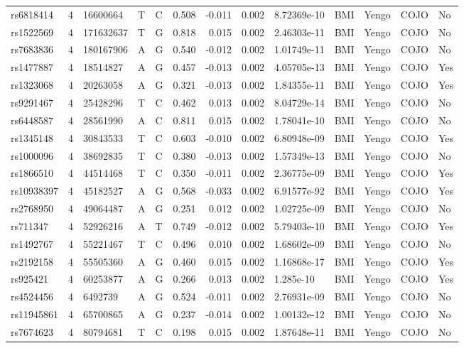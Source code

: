 \documentclass[11pt,twoside]{bristolthesis}
\begin{document}
\begin{longtable}[t]{lrlllrrrlllll}
rs6818414 & 4 & 16600664 & T & C & 0.508 & -0.011 & 0.002 & 8.72369e-10 & BMI & Yengo & COJO & No\\
\addlinespace
rs1522569 & 4 & 171632637 & T & G & 0.818 & 0.015 & 0.002 & 2.46303e-11 & BMI & Yengo & COJO & No\\
rs7683836 & 4 & 180167906 & A & G & 0.540 & -0.012 & 0.002 & 1.01749e-11 & BMI & Yengo & COJO & No\\
rs1477887 & 4 & 18514827 & A & G & 0.457 & -0.013 & 0.002 & 4.05705e-13 & BMI & Yengo & COJO & Yes\\
rs1323068 & 4 & 20263058 & A & G & 0.321 & -0.013 & 0.002 & 1.84355e-11 & BMI & Yengo & COJO & Yes\\
rs9291467 & 4 & 25428296 & T & C & 0.462 & 0.013 & 0.002 & 8.04729e-14 & BMI & Yengo & COJO & No\\
\addlinespace
rs6448587 & 4 & 28561990 & A & C & 0.811 & 0.015 & 0.002 & 1.78041e-10 & BMI & Yengo & COJO & No\\
rs1345148 & 4 & 30843533 & T & C & 0.603 & -0.010 & 0.002 & 6.80948e-09 & BMI & Yengo & COJO & Yes\\
rs1000096 & 4 & 38692835 & T & C & 0.380 & -0.013 & 0.002 & 1.57349e-13 & BMI & Yengo & COJO & No\\
rs1866510 & 4 & 44514468 & T & C & 0.350 & -0.011 & 0.002 & 2.36775e-09 & BMI & Yengo & COJO & Yes\\
rs10938397 & 4 & 45182527 & A & G & 0.568 & -0.033 & 0.002 & 6.91577e-92 & BMI & Yengo & COJO & Yes\\
\addlinespace
rs2768950 & 4 & 49064487 & A & G & 0.251 & 0.012 & 0.002 & 1.02725e-09 & BMI & Yengo & COJO & No\\
rs711347 & 4 & 52926216 & A & T & 0.749 & -0.012 & 0.002 & 5.79403e-10 & BMI & Yengo & COJO & Yes\\
rs1492767 & 4 & 55221467 & T & C & 0.496 & 0.010 & 0.002 & 1.68602e-09 & BMI & Yengo & COJO & No\\
rs2192158 & 4 & 55505360 & A & G & 0.460 & 0.015 & 0.002 & 1.16868e-17 & BMI & Yengo & COJO & Yes\\
rs925421 & 4 & 60253877 & A & G & 0.266 & 0.013 & 0.002 & 1.285e-10 & BMI & Yengo & COJO & Yes\\
\addlinespace
rs4524456 & 4 & 6492739 & A & G & 0.524 & -0.011 & 0.002 & 2.76931e-09 & BMI & Yengo & COJO & No\\
rs11945861 & 4 & 65700865 & A & G & 0.237 & -0.014 & 0.002 & 1.00132e-12 & BMI & Yengo & COJO & No\\
rs7674623 & 4 & 80794681 & T & C & 0.198 & 0.015 & 0.002 & 1.87648e-11 & BMI & Yengo & COJO & No\\

\end{longtable}
\end{document}
